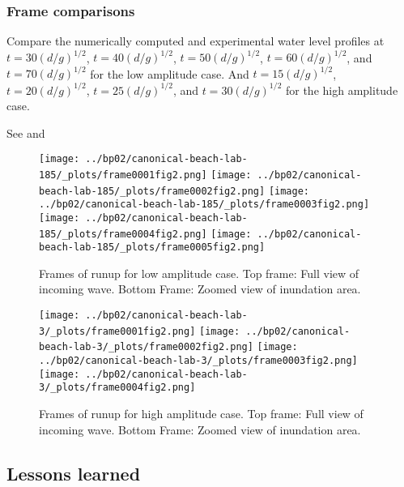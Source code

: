 \subsubsection{Frame comparisons}
Compare the numerically computed and experimental water level profiles at $t = 30(d/g)^{1/2}$, $t = 40(d/g)^{1/2}$, $t = 50(d/g)^{1/2}$, $t = 60(d/g)^{1/2}$, and $t = 70(d/g)^{1/2}$ for the low amplitude case. And $t = 15(d/g)^{1/2}$, $t = 20(d/g)^{1/2}$, $t = 25(d/g)^{1/2}$, and $t = 30(d/g)^{1/2}$ for the high amplitude case.

See  and 
\begin{figure}[ht]
\hfil\texttt{[image: ../bp02/canonical-beach-lab-185/\_plots/frame0001fig2.png]}\hfil
\hfil\texttt{[image: ../bp02/canonical-beach-lab-185/\_plots/frame0002fig2.png]}\hfil
\vskip 5pt
\hfil\texttt{[image: ../bp02/canonical-beach-lab-185/\_plots/frame0003fig2.png]}\hfil
\hfil\texttt{[image: ../bp02/canonical-beach-lab-185/\_plots/frame0004fig2.png]}\hfil
\vskip 5pt
\hfil\texttt{[image: ../bp02/canonical-beach-lab-185/\_plots/frame0005fig2.png]}\hfil
\caption{\label{fig:bp2framesa} 
Frames of runup for low amplitude case. Top frame: Full view of incoming wave. Bottom Frame: Zoomed view of inundation area.}
\end{figure}

\begin{figure}[ht]
\hfil\texttt{[image: ../bp02/canonical-beach-lab-3/\_plots/frame0001fig2.png]}\hfil
\hfil\texttt{[image: ../bp02/canonical-beach-lab-3/\_plots/frame0002fig2.png]}\hfil
\vskip 5pt
\hfil\texttt{[image: ../bp02/canonical-beach-lab-3/\_plots/frame0003fig2.png]}\hfil
\hfil\texttt{[image: ../bp02/canonical-beach-lab-3/\_plots/frame0004fig2.png]}\hfil
\caption{\label{fig:bp2framesb} 
Frames of runup for high amplitude case. Top frame: Full view of incoming wave. Bottom Frame: Zoomed view of inundation area.}
\end{figure}

\subsection{Lessons learned}

